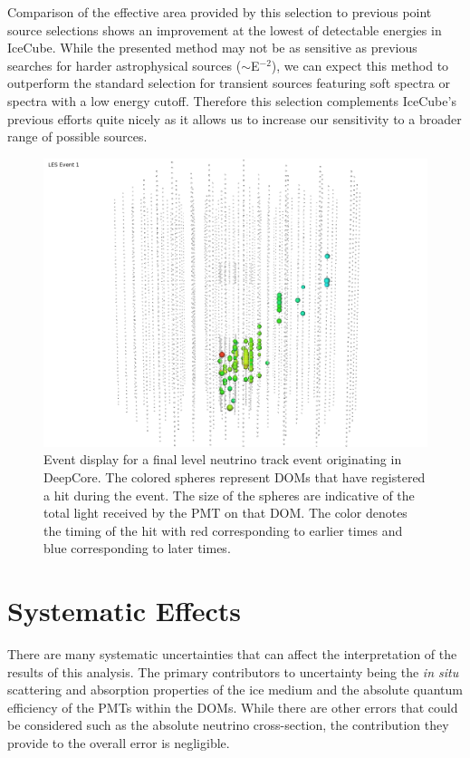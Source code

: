 \documentclass{gatech-thesis}
\begin{document}
Comparison of the effective area provided by this selection to previous point source selections shows an improvement at the lowest of detectable energies in IceCube. While the presented method may not be as sensitive as previous searches for harder astrophysical sources ($\sim$E$^{-2}$), we can expect this method to outperform the standard selection for transient sources featuring soft spectra or spectra with a low energy cutoff. Therefore this selection complements IceCube's previous efforts quite nicely as it allows us to increase our sensitivity to a broader range of possible sources. 

\begin{figure}[ht]
  \begin{center}
    \includegraphics[width=1.0\textwidth,keepaspectratio]{LESEventForThesis.png}
  \end{center}
  \caption{Event display for a final level neutrino track event originating in DeepCore. The colored spheres represent DOMs that have registered a hit during the event. The size of the spheres are indicative of the total light received by the PMT on that DOM. The color denotes the timing of the hit with red corresponding to earlier times and blue corresponding to later times.}
  \label{fig:LESEventFinal}
\end{figure}

\chapter{Systematic Effects}
There are many systematic uncertainties that can affect the interpretation of the results of this analysis. The primary contributors to uncertainty being the \textit{in situ} scattering and absorption properties of the ice medium and the absolute quantum efficiency of the PMTs within the DOMs. While there are other errors that could be considered such as the absolute neutrino cross-section, the contribution they provide to the overall error is negligible.
\end{document}

